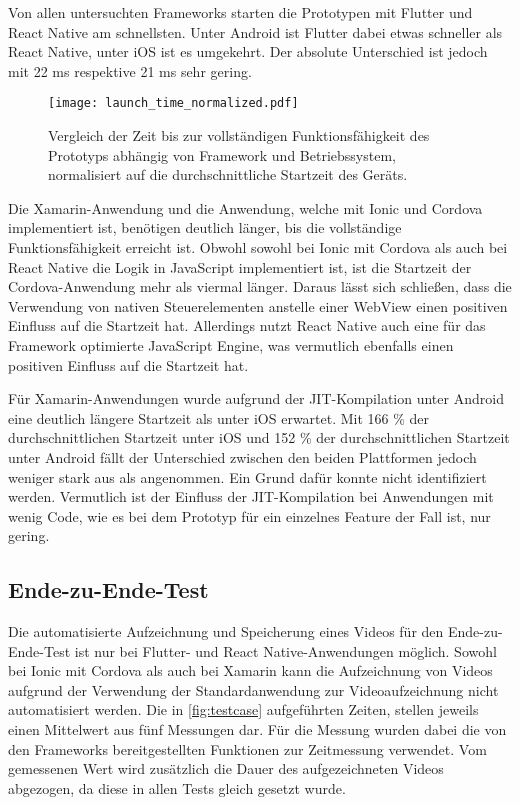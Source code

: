 Von allen untersuchten Frameworks starten die Prototypen mit Flutter und React Native am schnellsten.
Unter Android ist Flutter dabei etwas schneller als React Native, unter iOS ist es umgekehrt.
Der absolute Unterschied ist jedoch mit 22 ms respektive 21 ms sehr gering.

\begin{figure}[ht]
  \centering 
  \texttt{[image: launch\_time\_normalized.pdf]}
  \caption{Vergleich der Zeit bis zur vollständigen Funktionsfähigkeit des Prototyps abhängig von Framework und Betriebssystem, normalisiert auf die durchschnittliche Startzeit des Geräts.}
  \label{fig:launch_time_normalized}
\end{figure}
Die Xamarin-Anwendung und die Anwendung, welche mit Ionic und Cordova implementiert ist, benötigen deutlich länger, bis die vollständige Funktionsfähigkeit erreicht ist.
Obwohl sowohl bei Ionic mit Cordova als auch bei React Native die Logik in JavaScript implementiert ist, ist die Startzeit der Cordova-Anwendung mehr als viermal länger.
Daraus lässt sich schließen, dass die Verwendung von nativen Steuerelementen anstelle einer WebView einen positiven Einfluss auf die Startzeit hat.
Allerdings nutzt React Native auch eine für das Framework optimierte JavaScript Engine, was vermutlich ebenfalls einen positiven Einfluss auf die Startzeit hat.

Für Xamarin-Anwendungen wurde aufgrund der \ac{JIT}-Kompilation unter Android eine deutlich längere Startzeit als unter iOS erwartet.
Mit 166 \% der durchschnittlichen Startzeit unter iOS und 152 \% der durchschnittlichen Startzeit unter Android fällt der Unterschied zwischen den beiden Plattformen jedoch weniger stark aus als angenommen.
Ein Grund dafür konnte nicht identifiziert werden.
Vermutlich ist der Einfluss der \ac{JIT}-Kompilation bei Anwendungen mit wenig Code, wie es bei dem Prototyp für ein einzelnes Feature der Fall ist, nur gering.

\subsection{Ende-zu-Ende-Test}

Die automatisierte Aufzeichnung und Speicherung eines Videos für den Ende-zu-Ende-Test ist nur bei Flutter- und React Native-Anwendungen möglich.
Sowohl bei Ionic mit Cordova als auch bei Xamarin kann die Aufzeichnung von Videos aufgrund der Verwendung der Standardanwendung zur Videoaufzeichnung nicht automatisiert werden.
Die in \autoref{fig:testcase} aufgeführten Zeiten, stellen jeweils einen Mittelwert aus fünf Messungen dar.
Für die Messung wurden dabei die von den Frameworks bereitgestellten Funktionen zur Zeitmessung verwendet.
Vom gemessenen Wert wird zusätzlich die Dauer des aufgezeichneten Videos abgezogen, da diese in allen Tests gleich gesetzt wurde.

